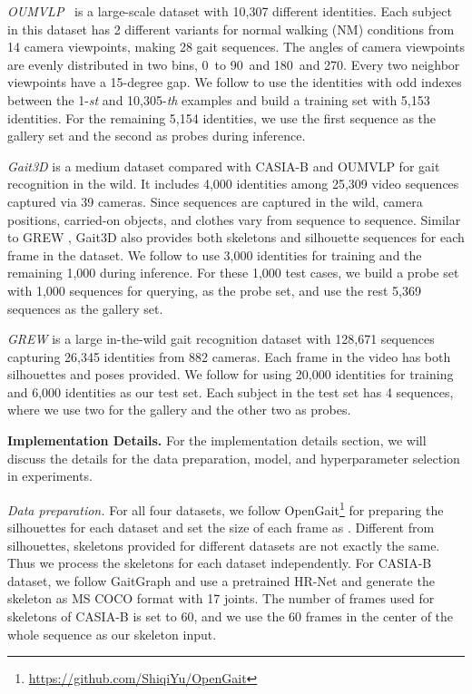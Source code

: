 \documentclass[10pt,twocolumn,letterpaper]{article}
\begin{document}
    
\textit{OUMVLP}~\cite{takemura2018multi,an2020performance} is a large-scale dataset with 10,307 different identities. Each subject in this dataset has 2 different variants for normal walking (NM) conditions from 14 camera viewpoints, making 28 gait sequences. The angles of camera viewpoints are evenly distributed in two bins, 0\degree\ to 90\degree\, and 180\degree\ and 270\degree. Every two neighbor viewpoints have a 15-degree gap. We follow \cite{chao2019gaitset,fan2020gaitpart,hou2020gln,lin2021gaitgl} to use the identities with odd indexes between the 1-\textit{st} and 10,305-\textit{th} examples and build a training set with 5,153 identities. For the remaining 5,154 identities, we use the first sequence as the gallery set and the second as probes during inference.


\textit{Gait3D} \cite{zheng2022gait} is a medium dataset compared with CASIA-B and OUMVLP for gait recognition in the wild. It includes 4,000 identities among 25,309 video sequences captured via 39 cameras. Since sequences are captured in the wild, camera positions, carried-on objects, and clothes vary from sequence to sequence. Similar to GREW \cite{zhu2021gait}, Gait3D also provides both skeletons and silhouette sequences for each frame in the dataset. We follow \cite{zheng2022gait} to use 3,000 identities for training and the remaining 1,000 during inference. For these 1,000 test cases, we build a probe set with 1,000 sequences for querying, as the probe set, and use the rest 5,369 sequences as the gallery set. 

\textit{GREW} \cite{zhu2021gait} is a large in-the-wild gait recognition dataset with 128,671 sequences capturing 26,345 identities from 882 cameras. Each frame in the video has both silhouettes and poses provided. We follow \cite{zhu2021gait} for using 20,000 identities for training and 6,000 identities as our test set. Each subject in the test set has 4 sequences, where we use two for the gallery and the other two as probes.

\textbf{Implementation Details.} For the implementation details section, we will discuss the details for the data preparation, model, and hyperparameter selection in experiments.

\textit{Data preparation.} For all four datasets, we follow OpenGait\footnote{\url{https://github.com/ShiqiYu/OpenGait}} for preparing the silhouettes for each dataset and set the size of each frame as . 
Different from silhouettes, skeletons provided for different datasets are not exactly the same. Thus we process the skeletons for each dataset independently.
For CASIA-B \cite{yu2006framework} dataset, we follow GaitGraph \cite{teepe2021gaitgraph} and use a pretrained HR-Net \cite{sun2019hrnet} and generate the skeleton as MS COCO \cite{lin2014microsoft} format with 17 joints. The number of frames used for skeletons of CASIA-B is set to 60, and we use the 60 frames in the center of the whole sequence as our skeleton input. 
\end{document}
